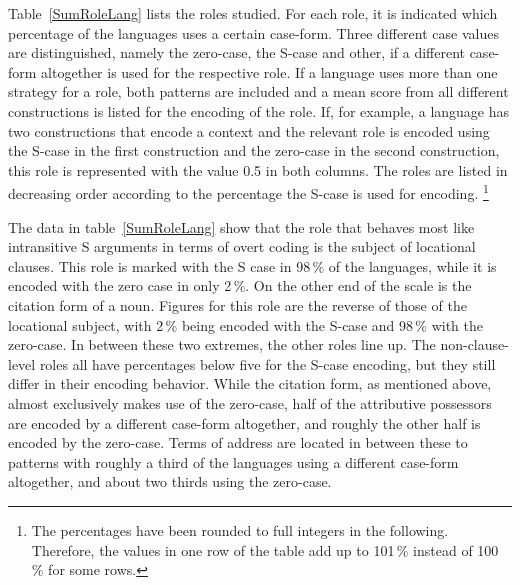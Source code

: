 Table~\ref{SumRoleLang} lists the roles studied. 
For each role, it is indicated which percentage of the languages uses a certain case-form. 
Three different case values are distinguished, namely the zero-case, the S-case and other, if a different case-form altogether is used for the respective role. 
If a language uses more than one strategy for a role, both patterns are included and a mean score from all different constructions is listed for the encoding of the role. 
If, for example, a language has two constructions that encode a context and the relevant role is encoded using the S-case in the first construction and the zero-case in the second construction, this role is represented with the value 0.5 in both columns.  
The roles are listed in decreasing order according to the percentage the S-case is used for encoding.
\footnote{The percentages have been rounded to full integers in the following. Therefore, the values in one row of the table add up to 101\,\% instead of 100\,\% for some rows.}

The data in table~\ref{SumRoleLang} show that the role that behaves most like intransitive S arguments in terms of overt coding is the subject of locational clauses. 
This role is marked with the S case in 98\,\% of the languages, while it is encoded with the zero case in only 2\,\%. 
On the other end of the scale is the citation form of a noun. 
Figures for this role are the reverse of those of the locational subject, with 2\,\% being encoded with the S-case and 98\,\% with the zero-case. 
In between these two extremes, the other roles line up. 
The non-clause-level roles all have percentages below five for the S-case encoding, but they still differ in their encoding behavior. 
While the citation form, as mentioned above, almost exclusively makes use of the zero-case, half of the attributive possessors are encoded by a different case-form altogether, and roughly the other half is encoded by the zero-case. 
Terms of address are located in between these to patterns with roughly a third of the languages using a different case-form altogether, and about two thirds using the zero-case. 
 
